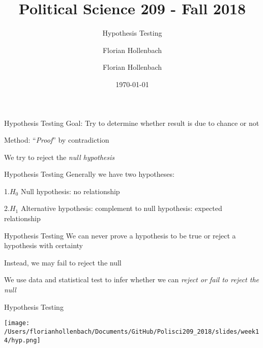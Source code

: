 \documentclass[presentation]{beamer}
\author{Florian Hollenbach}
\author{Florian Hollenbach}
\date{\today}
\title{Political Science 209 - Fall 2018}
\subtitle{Hypothesis Testing}
\begin{document}
\maketitle



\begin{frame}[label={sec:org004359b}]{Hypothesis Testing}
Goal: Try to determine whether result is due to chance or not

Method: ``\emph{Proof}'' by contradiction

We try to reject the \emph{null hypothesis}
\end{frame}

\begin{frame}[label={sec:org4cc7377}]{Hypothesis Testing}
Generally we have two hypotheses:

1.\(H_{0}\) Null hypothesis: no relationship

2.\(H_{1}\) Alternative hypothesis: complement to null hypothesis: expected relationship
\end{frame}

\begin{frame}[label={sec:orgd9d3bff}]{Hypothesis Testing}
We can \alert{never} prove a hypothesis to be true or reject a hypothesis with certainty

Instead, we may \alert{fail to reject the null}

We use data and statistical test to infer whether we can \emph{reject or fail to reject the null}
\end{frame}


\begin{frame}[label={sec:org075add4}]{Hypothesis Testing}
\begin{center}
\texttt{[image: /Users/florianhollenbach/Documents/GitHub/Polisci209\_2018/slides/week14/hyp.png]}
\end{center}
\end{frame}
\end{document}
